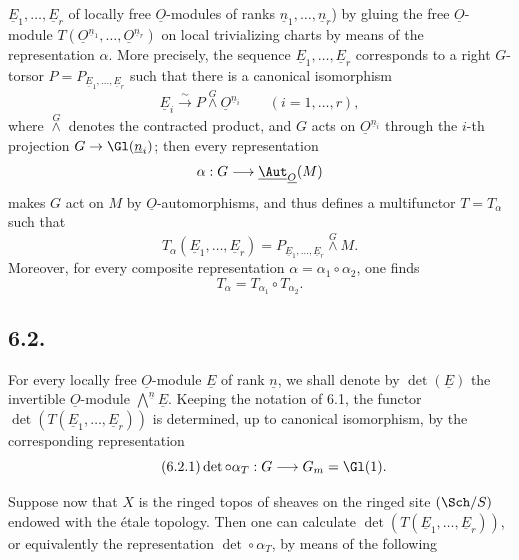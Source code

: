 \(\underline{E}_1,\ldots,\underline{E}_r\) of locally free \(\underline{O}\)-modules of ranks \(\underline{n}_1,\ldots,\underline{n}_r\)) by gluing the free \(\underline{O}\)-module \(T(\underline{O}^{\underline{n}_1},\ldots,\underline{O}^{\underline{n}_r})\) on local trivializing charts by means of the representation \(\alpha\). More precisely, the sequence \(\underline{E}_1,\ldots,\underline{E}_r\) corresponds to a right \(G\)-torsor \(P=P_{\underline{E}_1,\ldots,\underline{E}_r}\) such that there is a canonical isomorphism
\begin{equation}\tag{6.1.3}
 \underline{E}_i\xrightarrow{\sim}P\overset{G}{\wedge}\underline{O}^{\underline{n}_i}\qquad(i=1,\ldots,r),
\end{equation}
where \(\overset{G}{\wedge}\) denotes the contracted product, and \(G\) acts on \(\underline{O}^{\underline{n}_i}\) through the \(i\)-th projection \(G\to\Gl(\underline{n}_i)\); then every representation
\[
 \alpha:G\longrightarrow\underline{\Aut}_{\underline{O}}(M)
\]
makes \(G\) act on \(M\) by \(\underline{O}\)-automorphisms, and thus defines a multifunctor \(T=T_\alpha\) such that
\begin{equation}\tag{6.1.4}
 T_\alpha(\underline{E}_1,\ldots,\underline{E}_r)=P_{\underline{E}_1,\ldots,\underline{E}_r}\overset{G}{\wedge} M.
\end{equation}
Moreover, for every composite representation \(\alpha=\alpha_1\circ\alpha_2\), one finds
\begin{equation}\tag{6.1.5}
 T_\alpha=T_{\alpha_1}\circ T_{\alpha_2}.
\end{equation}

\subsection*{6.2.}
For every locally free \(\underline{O}\)-module \(\underline{E}\) of rank \(\underline{n}\), we shall denote by \(\det(\underline{E})\) the invertible \(\underline{O}\)-module \(\bigwedge\limits^{\underline{n}} \underline{E}\). Keeping the notation of 6.1, the functor \(\det(T(\underline{E}_1,\ldots,\underline{E}_r))\) is determined, up to canonical isomorphism, by the corresponding representation
\begin{equation}\tag{6.2.1}
 \det\circ\alpha_T:G\longrightarrow{G}_m=\Gl(1).
\end{equation}

Suppose now that \(X\) is the ringed topos of sheaves on the ringed site \((\Sch/S)\) endowed with the étale topology. Then one can calculate \(\det(T(\underline{E}_1,\ldots,\underline{E}_r))\), or equivalently the representation \(\det\circ\alpha_T\), by means of the following
